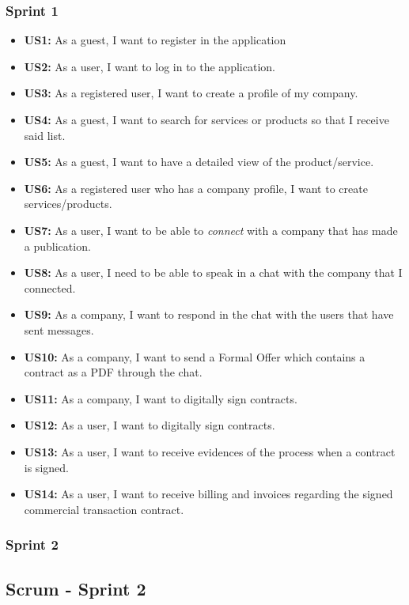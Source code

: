 \documentclass[./main.tex]{subfiles}
\begin{document}
\subsubsection{Sprint 1}
\begin{itemize}

\item
  \textbf{US1:} As a guest, I want to register in the application
\item
  \textbf{US2:} As a user, I want to log in to the application.
\item
  \textbf{US3:} As a registered user, I want to create a profile of my
  company.
\item
  \textbf{US4:} As a guest, I want to search for services or products so
  that I receive said list.
\item
  \textbf{US5:} As a guest, I want to have a detailed view of the
  product/service.
\item
  \textbf{US6:} As a registered user who has a company profile, I want
  to create services/products.
\item
  \textbf{US7:} As a user, I want to be able to \emph{connect} with a
  company that has made a publication.
\item
  \textbf{US8:} As a user, I need to be able to speak in a chat with the
  company that I connected.
\item
  \textbf{US9:} As a company, I want to respond in the chat with the
  users that have sent messages.
\item
  \textbf{US10:} As a company, I want to send a Formal Offer which
  contains a contract as a PDF through the chat.
\item
  \textbf{US11:} As a company, I want to digitally sign contracts.
\item
  \textbf{US12:} As a user, I want to digitally sign contracts.
\item
  \textbf{US13:} As a user, I want to receive evidences of the process
  when a contract is signed.
\item
  \textbf{US14:} As a user, I want to receive billing and invoices
  regarding the signed commercial transaction contract.
\end{itemize}

\subsubsection{Sprint 2}

\subsection{Scrum - Sprint 2}
\end{document}
